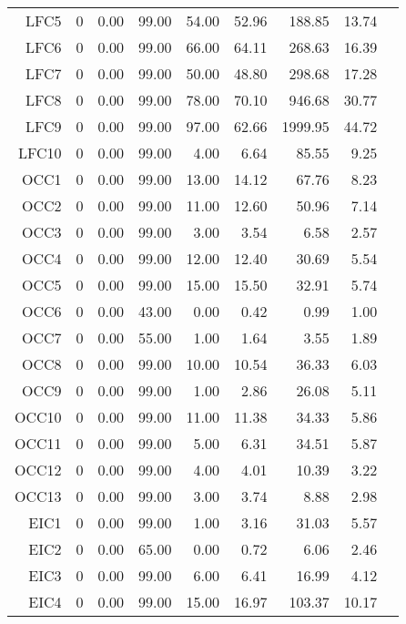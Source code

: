 \begin{longtable}{|rrrrrrrrr|}
	LFC5  &  0  &  0.00  &  99.00  &  54.00  &  52.96  &  188.85  &  13.74 & \\
	LFC6  &  0  &  0.00  &  99.00  &  66.00  &  64.11  &  268.63  &  16.39 & \\
	LFC7  &  0  &  0.00  &  99.00  &  50.00  &  48.80  &  298.68  &  17.28 & \\
	LFC8  &  0  &  0.00  &  99.00  &  78.00  &  70.10  &  946.68  &  30.77 & \\
	LFC9  &  0  &  0.00  &  99.00  &  97.00  &  62.66  &  1999.95  &  44.72 & \\
	LFC10  &  0  &  0.00  &  99.00  &  4.00  &  6.64  &  85.55  &  9.25 & \\
	OCC1  &  0  &  0.00  &  99.00  &  13.00  &  14.12  &  67.76  &  8.23 & \\
	OCC2  &  0  &  0.00  &  99.00  &  11.00  &  12.60  &  50.96  &  7.14 & \\
	OCC3  &  0  &  0.00  &  99.00  &  3.00  &  3.54  &  6.58  &  2.57 & \\
	OCC4  &  0  &  0.00  &  99.00  &  12.00  &  12.40  &  30.69  &  5.54 & \\
	OCC5  &  0  &  0.00  &  99.00  &  15.00  &  15.50  &  32.91  &  5.74 & \\
	OCC6  &  0  &  0.00  &  43.00  &  0.00  &  0.42  &  0.99  &  1.00 & \\
	OCC7  &  0  &  0.00  &  55.00  &  1.00  &  1.64  &  3.55  &  1.89 & \\
	OCC8  &  0  &  0.00  &  99.00  &  10.00  &  10.54  &  36.33  &  6.03 & \\
	OCC9  &  0  &  0.00  &  99.00  &  1.00  &  2.86  &  26.08  &  5.11 & \\
	OCC10  &  0  &  0.00  &  99.00  &  11.00  &  11.38  &  34.33  &  5.86 & \\
	OCC11  &  0  &  0.00  &  99.00  &  5.00  &  6.31  &  34.51  &  5.87 & \\
	OCC12  &  0  &  0.00  &  99.00  &  4.00  &  4.01  &  10.39  &  3.22 & \\
	OCC13  &  0  &  0.00  &  99.00  &  3.00  &  3.74  &  8.88  &  2.98 & \\
	EIC1  &  0  &  0.00  &  99.00  &  1.00  &  3.16  &  31.03  &  5.57 & \\
	EIC2  &  0  &  0.00  &  65.00  &  0.00  &  0.72  &  6.06  &  2.46 & \\
	EIC3  &  0  &  0.00  &  99.00  &  6.00  &  6.41  &  16.99  &  4.12 & \\
	EIC4  &  0  &  0.00  &  99.00  &  15.00  &  16.97  &  103.37  &  10.17 & \\

\end{longtable}
